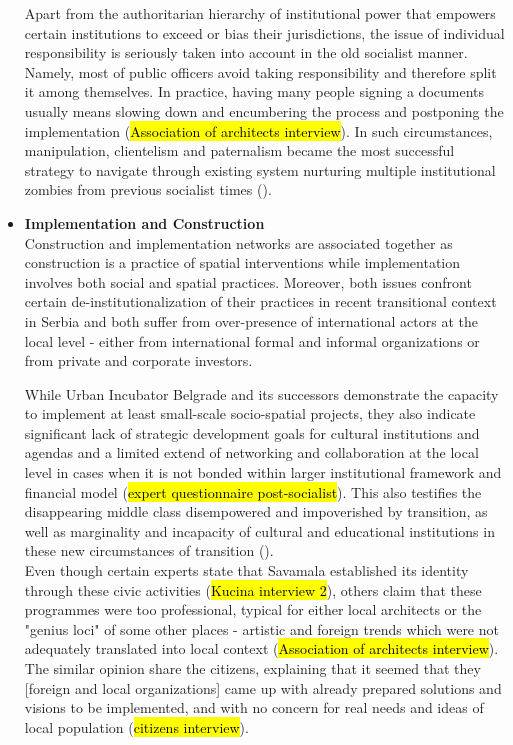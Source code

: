 \documentclass[11pt]{report}
\begin{document}
\begin{itemize}
Apart from the authoritarian hierarchy of institutional power that empowers certain institutions to exceed or bias their jurisdictions, the issue of individual responsibility is seriously taken into account in the old socialist manner. Namely, most of public officers avoid taking responsibility and therefore split it among themselves.
In practice, having many people signing a documents usually means slowing down and encumbering the process and postponing the implementation
(\hl{Association of architects interview}).
In such circumstances, manipulation, clientelism and paternalism became the most successful strategy to navigate through existing system nurturing multiple institutional zombies from previous socialist times (\cite{Vujosevic 2012}). 
\\

\item \textbf{Implementation and Construction}
\\
Construction and implementation networks are associated together as construction is a practice of spatial interventions while implementation involves both social and spatial practices.
Moreover, both issues confront certain de-institutionalization of their practices in recent transitional context in Serbia and both suffer from over-presence of international actors at the local level - either from international formal and informal organizations or from private and corporate investors.

While Urban Incubator Belgrade and its successors demonstrate the capacity to implement at least small-scale socio-spatial projects, they also indicate significant lack of strategic development goals for cultural institutions and agendas and a limited extend of networking and collaboration at the local level in cases when it is not bonded within larger institutional framework and financial model (\hl{expert questionnaire post-socialist}).
This also testifies the disappearing middle class disempowered and impoverished by transition, as well as marginality and incapacity of cultural and educational institutions in these new circumstances of transition (\cite{Samardzic in Doytchinov 2015}).
\\
Even though certain experts state that Savamala established its identity through these civic activities (\hl{Kucina interview 2}), others claim that these programmes were too professional, typical for either local architects or the "genius loci" of some other places - artistic and foreign trends which were not adequately translated into local context (\hl{Association of architects interview}).
The similar opinion share the citizens, explaining that it seemed that they [foreign and local organizations] came up with already prepared solutions and visions to be implemented, and with no concern for real needs and ideas of local population (\hl{citizens interview}).


\end{itemize}
\end{document}
